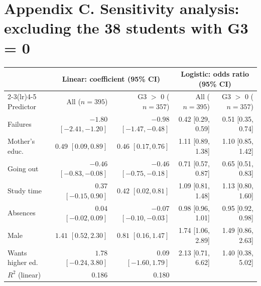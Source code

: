 \documentclass[11pt,a4paper]{article}
\begin{document}
\section*{Appendix C. Sensitivity analysis: excluding the 38 students with G3 = 0}
\begin{table}[H]
\centering\small
\begin{tabular}{lrrrr}
\toprule
 & \multicolumn{2}{c}{Linear: coefficient (95\% CI)} & \multicolumn{2}{c}{Logistic: odds ratio (95\% CI)} \\
\cmidrule(lr){2-3}\cmidrule(lr){4-5}
Predictor & All ($n=395$) & G3 $>$ 0 ($n=357$) & All ($n=395$) & G3 $>$ 0 ($n=357$) \\
\midrule
Failures & $-1.80$ $[-2.41, -1.20]$ & $-0.98$ $[-1.47, -0.48]$ & 0.42 [0.29, 0.59] & 0.51 [0.35, 0.74] \\
Mother's educ. & $0.49$ $[0.09, 0.89]$ & $0.46$ $[0.17, 0.76]$ & 1.11 [0.89, 1.38] & 1.10 [0.85, 1.42] \\
Going out & $-0.46$ $[-0.83, -0.08]$ & $-0.46$ $[-0.75, -0.18]$ & 0.71 [0.57, 0.87] & 0.65 [0.51, 0.83] \\
Study time & $0.37$ $[-0.15, 0.90]$ & $0.42$ $[0.02, 0.81]$ & 1.09 [0.81, 1.48] & 1.13 [0.80, 1.60] \\
Absences & $0.04$ $[-0.02, 0.09]$ & $-0.07$ $[-0.10, -0.03]$ & 0.98 [0.96, 1.01] & 0.95 [0.92, 0.98] \\
Male & $1.41$ $[0.52, 2.30]$ & $0.81$ $[0.16, 1.47]$ & 1.74 [1.06, 2.89] & 1.49 [0.86, 2.63] \\
Wants higher ed. & $1.78$ $[-0.24, 3.80]$ & $0.09$ $[-1.60, 1.79]$ & 2.13 [0.71, 6.62] & 1.40 [0.38, 5.02] \\
\midrule
$R^2$ (linear) & 0.186 & 0.180 & & \\
\bottomrule
\end{tabular}
\end{table}
\end{document}
